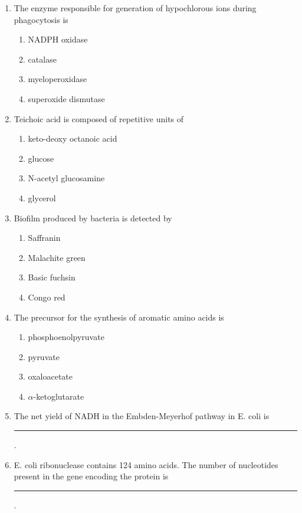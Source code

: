 \documentclass[journal,12pt,onecolumn]{IEEEtran}
\begin{document}
\begin{enumerate}[label=\arabic*.]
\item The enzyme responsible for generation of hypochlorous ions during phagocytosis is

\begin{multicols}{2}
\begin{enumerate}[label=(\Alph*)]
\item NADPH oxidase
\item catalase
\item myeloperoxidase
\item superoxide dismutase
\end{enumerate}
\end{multicols}

\item Teichoic acid is composed of repetitive units of

\begin{multicols}{2}
\begin{enumerate}[label=(\Alph*)]
\item keto-deoxy octanoic acid
\item glucose
\item N-acetyl glucosamine
\item glycerol
\end{enumerate}
\end{multicols}

\item Biofilm produced by bacteria is detected by

\begin{multicols}{4}
\begin{enumerate}[label=(\Alph*)]
\item Saffranin
\item Malachite green
\item Basic fuchsin
\item Congo red
\end{enumerate}
\end{multicols}

\item The precursor for the synthesis of aromatic amino acids is

\begin{multicols}{2}
\begin{enumerate}[label=(\Alph*)]
\item phosphoenolpyruvate
\item pyruvate
\item oxaloacetate
\item $\alpha$-ketoglutarate
\end{enumerate}
\end{multicols}

\item The net yield of NADH in the Embden-Meyerhof pathway in E. coli is \rule{2.5cm}{0.1pt}.

\item E. coli ribonuclease contains 124 amino acids. The number of nucleotides present in the gene encoding the protein is \rule{2.5cm}{0.1pt}.

\end{enumerate}
\end{document}
